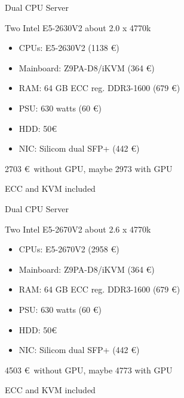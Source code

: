 \begin{frame}{Dual CPU Server}{}
	\begin{block}{Two Intel E5-2630V2 about 2.0 x 4770k}
		\begin{itemize}
	  		\item CPUs: E5-2630V2 (1138 \euro)
	  		\item Mainboard: Z9PA-D8/iKVM (364 \euro)
	  		\item RAM: 64 GB ECC reg. DDR3-1600 (679 \euro)
	  		\item PSU: 630 watts (60 \euro)
	  		\item HDD: 50\euro
	  		\item NIC: Silicom dual SFP+ (442 \euro)
		\end{itemize}	
		\begin{ergo}
			2703 \euro ~without GPU, maybe 2973 with GPU
		\end{ergo}
	\end{block}
	ECC and KVM included
\end{frame}

\begin{frame}{Dual CPU Server}{}
	\begin{block}{Two Intel E5-2670V2 about 2.6 x 4770k}
		\begin{itemize}
	  		\item CPUs: E5-2670V2 (2958 \euro)
	  		\item Mainboard: Z9PA-D8/iKVM (364 \euro)
	  		\item RAM: 64 GB ECC reg. DDR3-1600 (679 \euro)
	  		\item PSU: 630 watts (60 \euro)
	  		\item HDD: 50\euro
	  		\item NIC: Silicom dual SFP+ (442 \euro)
		\end{itemize}	
		\begin{ergo}
			4503 \euro ~without GPU, maybe 4773 with GPU
		\end{ergo}
	\end{block}
	ECC and KVM included
\end{frame}


\iffalse
\section*{Cryptocoin mining}
\begin{frame}{Make money with GPUs}{}
	\begin{block}{Most probably not feasible but..}
		A single ATI 7970 mines around 150 \euro a month while consuming around 300
		watts
		
		If we'd pay 0.1 \eur~ /kWh it would still be 110 \euro~a month
	\end{block}
	
	\begin{block}{Do it like video rendering companies}
		Let the GPUs mine during idle time: 70\% idle would make 65\euro~a month
		
		60 cards would make about 3900 \euro~ (or 2 new PCs) a month!
	\end{block}
\end{frame}
\fi